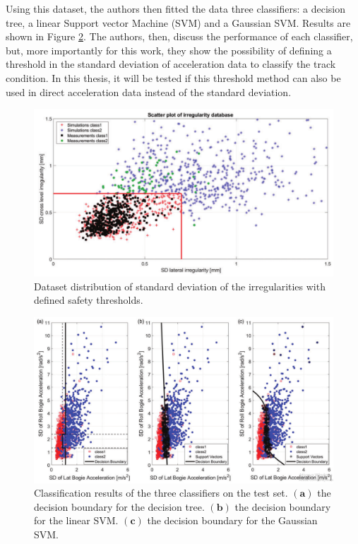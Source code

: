 Using this dataset, the authors then fitted the data three classifiers: a decision tree, a linear Support vector Machine (SVM) and a Gaussian SVM. Results are shown in Figure \ref{fig:DeRosa-2021-Results}. The authors, then, discuss the performance of each classifier, but, more importantly for this work, they show the possibility of defining a threshold in the standard deviation of acceleration data to classify the track condition. In this thesis, it will be tested if this threshold method can also be used in direct acceleration data instead of the standard deviation.

\begin{figure}[H]
    \centering
    \includegraphics[width=12cm]{Cap2_LitReview/Track_Quality_Accel/DeRosa (2021)/dataset.png}
    \caption{Dataset distribution of standard deviation of the irregularities with defined safety thresholds. \cite{DeRosa2021}}
    \label{fig:DeRosa-dataset}
\end{figure}

\begin{figure}[H]
    \centering
    \includegraphics[width=12cm]{Cap2_LitReview/Track_Quality_Accel/DeRosa (2021)/Results.png}
    \caption{Classification results of the three classifiers on the test set. $\boldsymbol{(a)}$ the decision boundary for the decision tree. $\boldsymbol{(b)}$ the decision boundary for the linear SVM. $\boldsymbol{(c)}$ the decision boundary for the Gaussian SVM. \cite{DeRosa2021}}
    \label{fig:DeRosa-2021-Results}
\end{figure}

